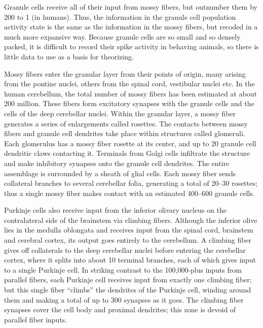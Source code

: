 Granule cells receive all of their input from mossy fibers, but outnumber them by 200 to 1 (in humans). Thus, the information in the granule cell population activity state is the same as the information in the mossy fibers, but recoded in a much more expansive way. Because granule cells are so small and so densely packed, it is difficult to record their spike activity in behaving animals, so there is little data to use as a basis for theorizing.

Mossy fibers enter the granular layer from their points of origin, many arising from the pontine nuclei, others from the spinal cord, vestibular nuclei etc. In the human cerebellum, the total number of mossy fibers has been estimated at about 200 million. These fibers form excitatory synapses with the granule cells and the cells of the deep cerebellar nuclei. Within the granular layer, a mossy fiber generates a series of enlargements called rosettes. The contacts between mossy fibers and granule cell dendrites take place within structures called glomeruli. Each glomerulus has a mossy fiber rosette at its center, and up to 20 granule cell dendritic claws contacting it. Terminals from Golgi cells infiltrate the structure and make inhibitory synapses onto the granule cell dendrites. The entire assemblage is surrounded by a sheath of glial cells. Each mossy fiber sends collateral branches to several cerebellar folia, generating a total of 20--30 rosettes; thus a single mossy fiber makes contact with an estimated 400--600 granule cells.

Purkinje cells also receive input from the inferior olivary nucleus on the contralateral side of the brainstem via climbing fibers. Although the inferior olive lies in the medulla oblongata and receives input from the spinal cord, brainstem and cerebral cortex, its output goes entirely to the cerebellum. A climbing fiber gives off collaterals to the deep cerebellar nuclei before entering the cerebellar cortex, where it splits into about 10 terminal branches, each of which gives input to a single Purkinje cell. In striking contrast to the 100,000-plus inputs from parallel fibers, each Purkinje cell receives input from exactly one climbing fiber; but this single fiber ``climbs'' the dendrites of the Purkinje cell, winding around them and making a total of up to 300 synapses as it goes. The climbing fiber synapses cover the cell body and proximal dendrites; this zone is devoid of parallel fiber inputs.

